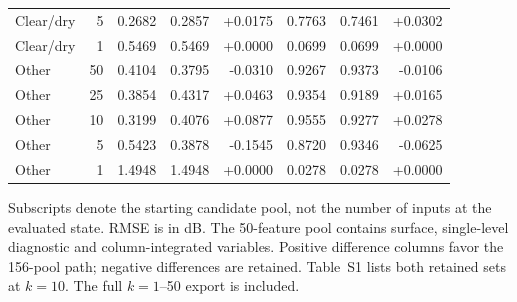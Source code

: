 \begin{table}[!htbp]
{\begin{tabular}{lrrrrrrr}
Clear/dry & 5 & 0.2682 & 0.2857 & +0.0175 & 0.7763 & 0.7461 & +0.0302 \\
Clear/dry & 1 & 0.5469 & 0.5469 & +0.0000 & 0.0699 & 0.0699 & +0.0000 \\
Other & 50 & 0.4104 & 0.3795 & -0.0310 & 0.9267 & 0.9373 & -0.0106 \\
Other & 25 & 0.3854 & 0.4317 & +0.0463 & 0.9354 & 0.9189 & +0.0165 \\
Other & 10 & 0.3199 & 0.4076 & +0.0877 & 0.9555 & 0.9277 & +0.0278 \\
Other & 5 & 0.5423 & 0.3878 & -0.1545 & 0.8720 & 0.9346 & -0.0625 \\
Other & 1 & 1.4948 & 1.4948 & +0.0000 & 0.0278 & 0.0278 & +0.0000 \\
\bottomrule
\end{tabular}
}
\par\smallskip
\begin{minipage}{\textwidth}\footnotesize Subscripts denote the starting candidate pool, not the number of inputs at the evaluated state. RMSE is in dB. The 50-feature pool contains surface, single-level diagnostic and column-integrated variables. Positive difference columns favor the 156-pool path; negative differences are retained. Table~S1 lists both retained sets at $k=10$. The full $k=1$--50 export is included.\end{minipage}
\end{table}
\endgroup
